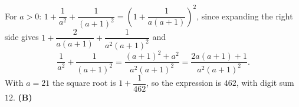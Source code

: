 For $a>0$: $1+\dfrac1{a^2}+\dfrac1{(a+1)^2}=\left(1+\dfrac1{a(a+1)}\right)^2$, since expanding the right side gives $1+\dfrac2{a(a+1)}+\dfrac1{a^2(a+1)^2}$ and
\[\dfrac1{a^2}+\dfrac1{(a+1)^2}=\dfrac{(a+1)^2+a^2}{a^2(a+1)^2}=\dfrac{2a(a+1)+1}{a^2(a+1)^2}.\]
With $a=21$ the square root is $1+\dfrac1{462}$, so the expression is $462$, with digit sum $12$. \textbf{(B)}
